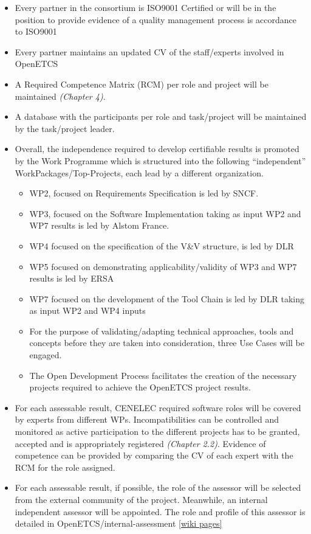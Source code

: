 \documentclass{template/openetcs_article}
\begin{document}
\begin{itemize}
\item Every partner in the consortium is ISO9001 Certified or will be in the position to provide evidence of a quality management process is accordance to ISO9001
\item Every partner maintains an updated CV of the staff/experts involved in OpenETCS
\item A Required Competence Matrix (RCM) per role and project will be maintained \textit{(Chapter 4)}.
\item A database with the participants per role and task/project will be maintained by the task/project leader.
\item Overall, the independence required to develop certifiable results is promoted by the Work Programme which is structured into the following “independent” WorkPackages/Top-Projects, each lead by a different organization.  
\begin{itemize}
\item WP2, focused on Requirements Specification is led by SNCF.
\item WP3, focused on the Software Implementation taking as input WP2 and WP7 results is led by Alstom France.
\item WP4 focused on the specification of the V\&V structure, is led by DLR
\item WP5 focused on demonstrating applicability/validity of WP3 and WP7 results is led by ERSA
\item WP7 focused on the development of the Tool Chain is led by DLR taking as input WP2 and WP4 inputs
\item For the purpose of validating/adapting technical approaches, tools and concepts before they are taken into consideration, three Use Cases will be engaged.
\item The Open Development Process facilitates the creation of the necessary projects required to achieve the OpenETCS project results.
\end{itemize}
\item For each assessable result, CENELEC required software roles will be covered by experts from different WPs. Incompatibilities can be controlled and monitored as active participation to the different projects has to be granted, accepted and is appropriately registered  \textit{(Chapter 2.2)}. Evidence of competence can be provided by comparing the CV of each expert with the RCM for the role assigned.
\item For each assessable result, if possible, the role of the assessor will be selected from the external community of the project. Meanwhile, an internal independent assessor will be appointed. The role and profile of this assessor is detailed in OpenETCS/internal-assessment \citep{IA} \href{https://github.com/openETCS/ecosystem/wiki/WP4:-internal-assessment}{[wiki pages]}
\end{itemize}
\end{document}
